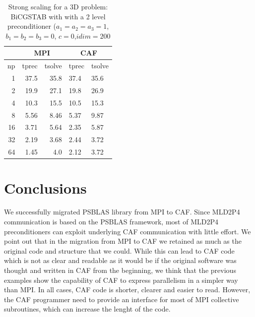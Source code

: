 \documentclass{IOS-Book-Article}
\begin{document}
\begin{table}[]
\centering
\caption{Strong scaling for a 3D problem: BiCGSTAB with with a 2 level preconditioner ($a_1=a_2=a_3=1$, $b_1=b_2=b_3=0$, $c=0$,$idim=200$}
\label{Strong2}
\begin{tabular}{@{}rrrll@{}}
\multicolumn{1}{l}{}   & \multicolumn{2}{c}{MPI}                                & \multicolumn{2}{c}{CAF} \\ \midrule
\multicolumn{1}{c}{np} & \multicolumn{1}{c}{tprec} & \multicolumn{1}{c}{tsolve} & tprec      & tsolve     \\ \midrule
1                      & 37.5                      & 35.8                       & 37.4       & 35.6       \\
2                      & 19.9                      & 27.1                       & 19.8       & 26.9       \\
4                      & 10.3                      & 15.5                       & 10.5       & 15.3       \\
8                      & 5.56                      & 8.46                       & 5.37       & 9.87       \\
16                     & 3.71                      & 5.64                       & 2.35       & 5.87       \\
32                     & 2.19                      & 3.68                       & 2.44       & 3.72       \\
64                     & 1.45                      & 4.0                        & 2.12       & 3.72       \\ \bottomrule
\end{tabular}
\end{table} 
  
\section{Conclusions}

We successfully migrated PSBLAS library from MPI to CAF. Since MLD2P4 communication is based on the PSBLAS framework, most of MLD2P4 preconditioners can exploit underlying CAF communication with little effort. We point out that in the migration from MPI to CAF we retained as much as the original code and structure that we could. While this can lead to CAF code which is not as clear and readable as it would be if the original software was thought and written in CAF from the beginning, we think that the previous examples show the capability of CAF to express parallelism in a simpler way than MPI. In all cases, CAF code is shorter, clearer and easier to read. However, the CAF programmer need to provide an interface for most of MPI collective subroutines, which can increase the lenght of the code. 
\end{document}
